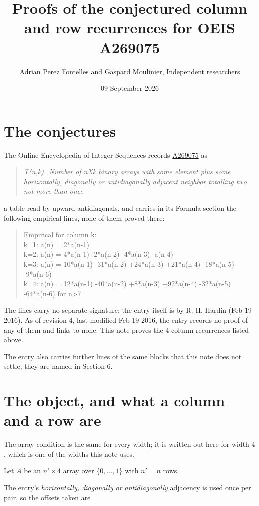 \documentclass[11pt]{article}
\title{Proofs of the conjectured column and row recurrences for OEIS A269075}
\author{Adrian Perez Fontelles and Gaspard Moulinier, Independent researchers}
\date{09 September 2026}
\theoremstyle{definition}
\begin{document}
\maketitle
\section{The conjectures}

The Online Encyclopedia of Integer Sequences records \href{https://oeis.org/A269075}{A269075} as

\begin{quote}\itshape T(n,k)=Number of nXk binary arrays with some element plus some horizontally, diagonally or antidiagonally adjacent neighbor totalling two not more than once\end{quote}

a table read by upward antidiagonals, and carries in its Formula section the following empirical lines, none of them proved there:

\begin{quote}\ttfamily Empirical for column k:\\
k=1: a(n) = 2*a(n-1)\\k=2: a(n) = 4*a(n-1) -2*a(n-2) -4*a(n-3) -a(n-4)\\k=3: a(n) = 10*a(n-1) -31*a(n-2) +24*a(n-3) +21*a(n-4) -18*a(n-5) -9*a(n-6)\\k=4: a(n) = 12*a(n-1) -40*a(n-2) +8*a(n-3) +92*a(n-4) -32*a(n-5) -64*a(n-6) for n>7\end{quote}

The lines carry no separate signature; the entry itself is by R. H. Hardin (Feb 19 2016). As of revision 4, last modified Feb 19 2016, the entry records no proof of any of them and links to none. This note proves the 4 column recurrences listed above.

The entry also carries further lines of the same blocks that this note does not settle; they are named in Section 6.

\section{The object, and what a column and a row are}

The array condition is the same for every width; it is written out here for width $4$, which is one of the widths this note uses.

Let $A$ be an $n' \times 4$ array over $\{0,\dots,1\}$ with $n' = n$ rows.

The entry's {\itshape horizontally, diagonally or antidiagonally} adjacency is used once per pair, so the offsets taken are
\end{document}
